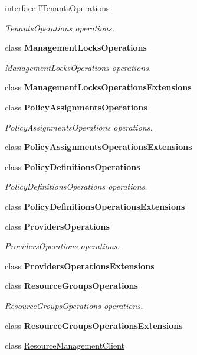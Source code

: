 \begin{DoxyCompactItemize}
interface \hyperlink{interface_microsoft_1_1_azure_1_1_management_1_1_resources_1_1_i_tenants_operations}{I\+Tenants\+Operations}
\begin{DoxyCompactList}\small\item\em Tenants\+Operations operations. \end{DoxyCompactList}\item 
class {\bfseries Management\+Locks\+Operations}
\begin{DoxyCompactList}\small\item\em Management\+Locks\+Operations operations. \end{DoxyCompactList}\item 
class {\bfseries Management\+Locks\+Operations\+Extensions}
\item 
class {\bfseries Policy\+Assignments\+Operations}
\begin{DoxyCompactList}\small\item\em Policy\+Assignments\+Operations operations. \end{DoxyCompactList}\item 
class {\bfseries Policy\+Assignments\+Operations\+Extensions}
\item 
class {\bfseries Policy\+Definitions\+Operations}
\begin{DoxyCompactList}\small\item\em Policy\+Definitions\+Operations operations. \end{DoxyCompactList}\item 
class {\bfseries Policy\+Definitions\+Operations\+Extensions}
\item 
class {\bfseries Providers\+Operations}
\begin{DoxyCompactList}\small\item\em Providers\+Operations operations. \end{DoxyCompactList}\item 
class {\bfseries Providers\+Operations\+Extensions}
\item 
class {\bfseries Resource\+Groups\+Operations}
\begin{DoxyCompactList}\small\item\em Resource\+Groups\+Operations operations. \end{DoxyCompactList}\item 
class {\bfseries Resource\+Groups\+Operations\+Extensions}
\item 
class \hyperlink{class_microsoft_1_1_azure_1_1_management_1_1_resources_1_1_resource_management_client}{Resource\+Management\+Client}

\end{DoxyCompactItemize}
